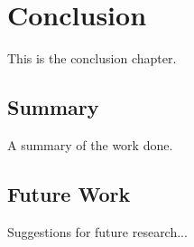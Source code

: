 \section{Conclusion}

This is the conclusion chapter.

\subsection{Summary}
A summary of the work done.

\subsection{Future Work}
Suggestions for future research...